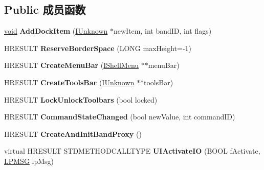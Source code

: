 \subsection*{Public 成员函数}
\begin{DoxyCompactItemize}
\item 
\mbox{\label{class_c_internet_toolbar_a56f84850af48551b429eed67248a51f5}} 
\hyperlink{interfacevoid}{void} {\bfseries Add\+Dock\+Item} (\hyperlink{interface_i_unknown}{I\+Unknown} $\ast$new\+Item, int band\+ID, int flags)
\item 
\mbox{\label{class_c_internet_toolbar_a194839e59cabf2381febdec6b78abb57}} 
H\+R\+E\+S\+U\+LT {\bfseries Reserve\+Border\+Space} (L\+O\+NG max\+Height=-\/1)
\item 
\mbox{\label{class_c_internet_toolbar_a5135466d2edc84ab28d519abb2a8b7d4}} 
H\+R\+E\+S\+U\+LT {\bfseries Create\+Menu\+Bar} (\hyperlink{interface_i_shell_menu}{I\+Shell\+Menu} $\ast$$\ast$menu\+Bar)
\item 
\mbox{\label{class_c_internet_toolbar_a798892c7f41ce7a2ac998cace8dc4f21}} 
H\+R\+E\+S\+U\+LT {\bfseries Create\+Tools\+Bar} (\hyperlink{interface_i_unknown}{I\+Unknown} $\ast$$\ast$tools\+Bar)
\item 
\mbox{\label{class_c_internet_toolbar_a2f9d1eac1bdeb042a6f7a6c868c06cfb}} 
H\+R\+E\+S\+U\+LT {\bfseries Lock\+Unlock\+Toolbars} (bool locked)
\item 
\mbox{\label{class_c_internet_toolbar_a00310176832f6239bfb531e2adaff74c}} 
H\+R\+E\+S\+U\+LT {\bfseries Command\+State\+Changed} (bool new\+Value, int command\+ID)
\item 
\mbox{\label{class_c_internet_toolbar_a7a5ee3d6b955f9aff7c84f24805d9069}} 
H\+R\+E\+S\+U\+LT {\bfseries Create\+And\+Init\+Band\+Proxy} ()
\item 
\mbox{\label{class_c_internet_toolbar_ac64e45b942b9ffa8d0720a9b6df0c113}} 
virtual H\+R\+E\+S\+U\+LT S\+T\+D\+M\+E\+T\+H\+O\+D\+C\+A\+L\+L\+T\+Y\+PE {\bfseries U\+I\+Activate\+IO} (B\+O\+OL f\+Activate, \hyperlink{structtag_m_s_g}{L\+P\+M\+SG} lp\+Msg)

\end{DoxyCompactItemize}

